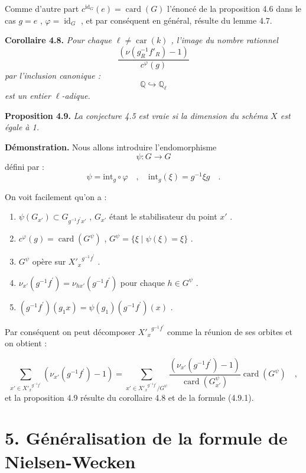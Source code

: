 \documentclass[11pt]{article}
\newcommand{\car}{\operatorname{car}}
\providecommand{\car}{\operatorname{car}}
\providecommand{\id}{\operatorname{id}}
\providecommand{\id}{\operatorname{id}}
\providecommand{\id}{\operatorname{id}}
\providecommand{\car}{\operatorname{car}}
\providecommand{\id}{\operatorname{id}}
\providecommand{\id}{\operatorname{id}}
\providecommand{\bQ}{\mathbb Q}
\providecommand{\card}{\operatorname{card}}
\providecommand{\car}{\operatorname{car}}
\begin{document}
Comme d'autre part $c^{\id_G}(e) = \card(G)$ l'énoncé de la proposition 4.6 dans le cas $g = e$ , $\varphi = \id_G$ , et par conséquent en général, résulte du lemme 4.7.

\medskip
\noindent
\textbf{Corollaire 4.8.} \emph{Pour chaque $\ell \neq \car(k)$ , l'image du nombre rationnel
\[
\frac{(\nu(g_R^{-1}f'_R) - 1)}{c^\varphi(g)}
\]
par l'inclusion canonique :
\[
\bQ \hookrightarrow \bQ_\ell
\]
est un entier $\ell$-adique.}

\medskip
\noindent
\textbf{Proposition 4.9.} \emph{La conjecture 4.5 est vraie si la dimension du schéma $X$ est égale à 1.}

\medskip

\noindent
\textbf{Démonstration.} Nous allons introduire l'endomorphisme
\[
\psi : G \longrightarrow G
\]
défini par :
\[
\psi = \mathrm{int}_g \circ \varphi \quad , \quad \mathrm{int}_g(\xi) = g^{-1}\xi g \quad .
\]

On voit facilement qu'on a :
\begin{enumerate}
\item[i)] $\psi(G_{x'}) \subset G_{g^{-1}f^{\prime}x'}$ , $G_{x'}$ étant le stabilisateur du point $x'$ .
\item[ii)] $c^\varphi(g) = \card(G^\psi)$ , $G^\psi = \{ \xi \mid \psi(\xi) = \xi \}$ .
\item[iii)] $G^\psi$ opère sur ${X'_x}^{g^{-1}f^{\prime}}$ .
\item[iv)] $\nu_{x'}(g^{-1}f^{\prime}) = \nu_{hx'}(g^{-1}f^{\prime})$ pour chaque $h \in G^\psi$ .
\item[v)] $(g^{-1}f^{\prime})(g_1x) = \psi(g_1)(g^{-1}f^{\prime})(x)$ .
\end{enumerate}

Par conséquent on peut décomposer ${X'_x}^{g^{-1}f^{\prime}}$ comme la réunion de ses orbites et on obtient :

\begin{equation}\tag{4.9.1}
\sum_{x' \in {X'_x}^{g^{-1}f^{\prime}}} (\nu_{x'}(g^{-1}f^{\prime}) - 1) = \sum_{x' \in {X'_x}^{g^{-1}f^{\prime}}/G^\psi} \frac{(\nu_{x'}(g^{-1}f^{\prime}) - 1)}{\card(G^\psi_{x'})} \card(G^\psi) \quad ,
\end{equation}
et la proposition 4.9 résulte du corollaire 4.8 et de la formule (4.9.1).


\section*{5. Généralisation de la formule de Nielsen-Wecken}
\end{document}
